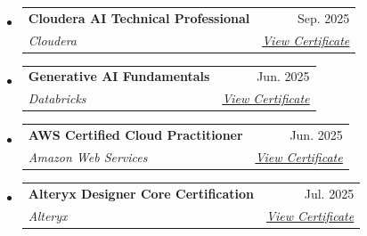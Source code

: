 \documentclass[letterpaper,11pt]{article}
\makeatletter
\newcommand{\resumeSubheading}[4]{
  \vspace{-2pt}\item
    \begin{tabular*}{0.97\textwidth}[t]{l@{\extracolsep{\fill}}r}
      \textbf{#1} & #2 \\
      \textit{\small#3} & \textit{\small #4} \\
    \end{tabular*}\vspace{-7pt}
}
\newcommand{\techtag}[1]{
  {\small\colorbox{techbg}{\textcolor{primary}{#1}}}
}
\newcommand{\resumeSubHeadingListStart}{
  \begin{itemize}[leftmargin=0.15in, label={}]
}
\newcommand{\resumeSubHeadingListEnd}{
  \end{itemize}
}
\makeatother
\begin{document}
\resumeSubHeadingListStart

  \resumeSubheading
    {Cloudera AI Technical Professional}
    {Sep. 2025}
    {\techtag{Cloudera}}
    {\href{https://www.credly.com/badges/672c14d2-71a7-45e2-8a1e-9ac16de6c252}
    {\underline{View Certificate}}}

  \medskip

  \resumeSubheading
    {Generative AI Fundamentals}
    {Jun. 2025}
    {\techtag{Databricks}}
    {\href{https://credentials.databricks.com/812f267d-76c2-4995-9fa7-c563b2588259\#acc.da815NjL}
    {\underline{View Certificate}}}

  \medskip

  \resumeSubheading
    {AWS Certified Cloud Practitioner}
    {Jun. 2025}
    {\techtag{Amazon Web Services}}
    {\href{https://www.credly.com/badges/22bc8dbc-ff6b-461c-a01f-893707897200}
    {\underline{View Certificate}}}

  \medskip

  \resumeSubheading
    {Alteryx Designer Core Certification}
    {Jul. 2025}
    {\techtag{Alteryx}}
    {\href{https://www.credly.com/badges/98599ad4-e33c-4f43-bfe5-d1e23ff2b6b5}
    {\underline{View Certificate}}}

\resumeSubHeadingListEnd
\end{document}
